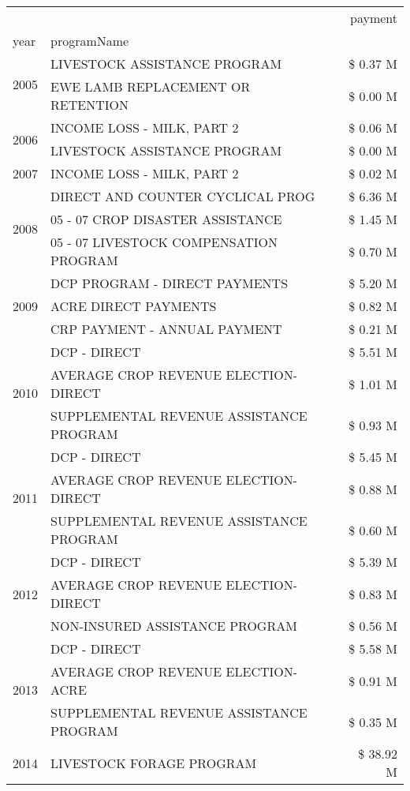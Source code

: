 \begin{tabular}{llr}
\toprule
 &  & payment \\
year & programName &  \\
\midrule
\multirow[t]{2}{*}{2005} & LIVESTOCK ASSISTANCE PROGRAM & \$ 0.37 M \\
 & EWE LAMB REPLACEMENT OR RETENTION & \$ 0.00 M \\
\cline{1-3}
\multirow[t]{2}{*}{2006} & INCOME LOSS - MILK, PART 2 & \$ 0.06 M \\
 & LIVESTOCK ASSISTANCE PROGRAM & \$ 0.00 M \\
\cline{1-3}
2007 & INCOME LOSS - MILK, PART 2 & \$ 0.02 M \\
\cline{1-3}
\multirow[t]{3}{*}{2008} & DIRECT AND COUNTER CYCLICAL PROG & \$ 6.36 M \\
 & 05 - 07 CROP DISASTER ASSISTANCE & \$ 1.45 M \\
 & 05 - 07 LIVESTOCK COMPENSATION PROGRAM & \$ 0.70 M \\
\cline{1-3}
\multirow[t]{3}{*}{2009} & DCP PROGRAM - DIRECT PAYMENTS & \$ 5.20 M \\
 & ACRE DIRECT PAYMENTS & \$ 0.82 M \\
 & CRP PAYMENT - ANNUAL PAYMENT & \$ 0.21 M \\
\cline{1-3}
\multirow[t]{3}{*}{2010} & DCP - DIRECT & \$ 5.51 M \\
 & AVERAGE CROP REVENUE ELECTION-DIRECT & \$ 1.01 M \\
 & SUPPLEMENTAL REVENUE ASSISTANCE PROGRAM & \$ 0.93 M \\
\cline{1-3}
\multirow[t]{3}{*}{2011} & DCP - DIRECT & \$ 5.45 M \\
 & AVERAGE CROP REVENUE ELECTION-DIRECT & \$ 0.88 M \\
 & SUPPLEMENTAL REVENUE ASSISTANCE PROGRAM & \$ 0.60 M \\
\cline{1-3}
\multirow[t]{3}{*}{2012} & DCP - DIRECT & \$ 5.39 M \\
 & AVERAGE CROP REVENUE ELECTION-DIRECT & \$ 0.83 M \\
 & NON-INSURED ASSISTANCE PROGRAM & \$ 0.56 M \\
\cline{1-3}
\multirow[t]{3}{*}{2013} & DCP - DIRECT & \$ 5.58 M \\
 & AVERAGE CROP REVENUE ELECTION-ACRE & \$ 0.91 M \\
 & SUPPLEMENTAL REVENUE ASSISTANCE PROGRAM & \$ 0.35 M \\
\cline{1-3}
\multirow[t]{3}{*}{2014} & LIVESTOCK FORAGE PROGRAM & \$ 38.92 M \\

\end{tabular}
